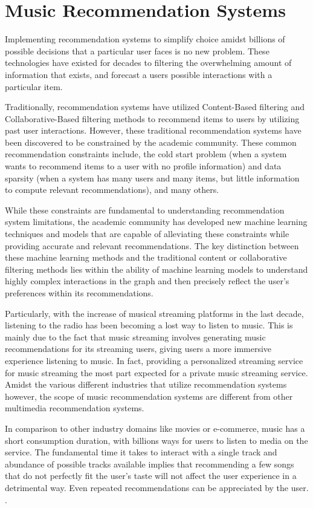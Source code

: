 \section{Music Recommendation Systems}
Implementing recommendation systems to simplify choice amidst billions of possible decisions that a particular user faces is no new problem. These technologies have existed for decades to filtering the overwhelming amount of information that exists, and forecast a users possible interactions with a particular item. 

Traditionally, recommendation systems have utilized Content-Based filtering and Collaborative-Based filtering methods to recommend items to users by utilizing past user interactions. However, these traditional recommendation systems have been discovered to be constrained by the academic community. These common recommendation constraints include, the cold start problem (when a system wants to recommend items to a user with no profile information) and data sparsity (when a system has many users and many items, but little information to compute relevant recommendations), and many others. \cite{Guo2020}

While these constraints are fundamental to understanding recommendation system limitations, the academic community has developed new machine learning techniques and models that are capable of alleviating these constraints while providing accurate and relevant recommendations. The key distinction between these machine learning methods and the traditional content or collaborative filtering methods lies within the ability of machine learning models to understand highly complex interactions in the graph and then precisely reflect the user's preferences within its recommendations. 

Particularly, with the increase of musical streaming platforms in the last decade, listening to the radio has been becoming a lost way to listen to music. This is mainly due to the fact that music streaming involves generating music recommendations for its streaming users, giving users a more immersive experience listening to music. In fact, providing a personalized streaming service for music streaming the most part expected for a private music streaming service. Amidst the various different industries that utilize recommendation systems however, the scope of music recommendation systems are different from other multimedia recommendation systems.

In comparison to other industry domains like movies or e-commerce, music has a short consumption duration, with billions ways for users to listen to media on the service. The fundamental time it takes to interact with a single track and abundance of possible tracks available implies that recommending a few songs that do not perfectly fit the user's taste will not affect the user experience in a detrimental way. Even repeated recommendations can be appreciated by the user. \cite{Riegler2019}. 

